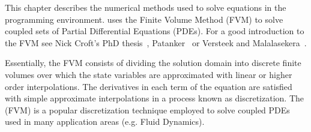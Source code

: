 This chapter describes the numerical methods used to solve equations
in the \FiPy{} programming environment. \FiPy{} uses the Finite Volume
Method (FVM) to solve coupled sets of Partial Differential Equations
(PDEs). For a good introduction to the FVM see
Nick Croft's PhD thesis~\cite{croftphd}, Patanker~\cite{patanker} or Versteek and
Malalasekera~\cite{versteeg_malalasekera}.

Essentially, the FVM consists of dividing the solution domain into
discrete finite volumes over which the state variables are
approximated with linear or higher order interpolations. The
derivatives in each term of the equation are satisfied with simple
approximate interpolations in a process known as discretization. The
(FVM) is a popular discretization technique employed to solve coupled
PDEs used in many application areas (e.g. Fluid Dynamics).






